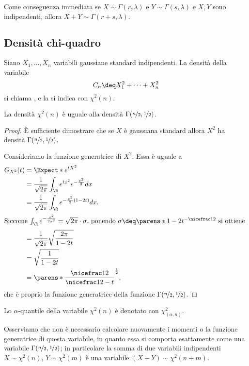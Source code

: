 Come conseguenza immediata se $X \sim \Gamma(r, \lambda)$ e $Y \sim \Gamma(s, \lambda)$ e $X, Y$ sono indipendenti, allora $X + Y \sim \Gamma(r + s, \lambda)$.

\subsection{Densità chi-quadro}

\begin{definition}
    Siano $X_1, \dots, X_n$ variabili gaussiane standard indipendenti. La densità della variabile \[
        C_n \deq X_1^2 + \dots + X_n^2    
    \] si chiama , e la si indica con $\chi^2(n)$.
\end{definition}

\begin{proposition}
    La densità $\chi^2(n)$ è uguale alla densità $\Gamma(\nicefrac{n}{2}, \nicefrac{1}{2})$.
\end{proposition}
\begin{proof}
    È sufficiente dimostrare che se $X$ è gaussiana standard allora $X^2$ ha densità $\Gamma(\nicefrac{n}{2}, \nicefrac{1}{2})$.

    Consideriamo la funzione generatrice di $X^2$. Essa è uguale a \begin{align*}
        G_{X^2}(t) &= \Expect*{e^{tX^2}}\\
        &= \frac{1}{\sqrt{2\pi}} \int_\R e^{tx^2}e^{-\frac{x^2}{2}} dx\\
        &= \frac{1}{\sqrt{2\pi}} \int_\R e^{-\frac{x^2}{2}(1 - 2t)} dx.\\
        \intertext{Siccome $\int_\R e^{-\frac{x^2}{2\sigma^2}} = \sqrt{2\pi} \cdot \sigma$, ponendo $\sigma \deq \parens*{1 - 2t}^{-\nicefrac12}$ si ottiene }
        &= \frac{1}{\sqrt{2\pi}} \sqrt{\frac{2\pi}{1-2t}}\\
        &= \sqrt{\frac{1}{1-2t}}\\
        &= \parens*{\frac{\nicefrac12}{\nicefrac12 - t}}^\frac12,
    \end{align*} che è proprio la funzione generatrice della funzione $\Gamma(\nicefrac{n}{2}, \nicefrac12)$.
\end{proof}

Lo $\alpha$-quantile della variabile $\chi^2(n)$ è denotato con $\chi^2_{(\alpha, n)}$.

Osserviamo che non è necessario calcolare nuovamente i momenti o la funzione generatrice di questa variabile, in quanto essa si comporta esattamente come una variabile $\Gamma(\nicefrac{n}{2}, \nicefrac12)$; in particolare la somma di due variabili indipendenti $X \sim \chi^2(n)$, $Y \sim \chi^2(m)$ è una variabile $(X + Y) \sim \chi^2(n + m)$.

